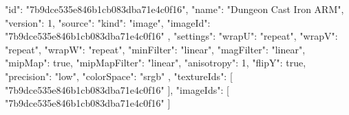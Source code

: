 {
  "id": "7b9dce535e846b1cb083dba71e4c0f16",
  "name": "Dungeon Cast Iron ARM",
  "version": 1,
  "source": {
    "kind": "image",
    "imageId": "7b9dce535e846b1cb083dba71e4c0f16"
  },
  "settings": {
    "wrapU": "repeat",
    "wrapV": "repeat",
    "wrapW": "repeat",
    "minFilter": "linear",
    "magFilter": "linear",
    "mipMap": true,
    "mipMapFilter": "linear",
    "anisotropy": 1,
    "flipY": true,
    "precision": "low",
    "colorSpace": "srgb"
  },
  "textureIds": [
    "7b9dce535e846b1cb083dba71e4c0f16"
  ],
  "imageIds": [
    "7b9dce535e846b1cb083dba71e4c0f16"
  ]
}
